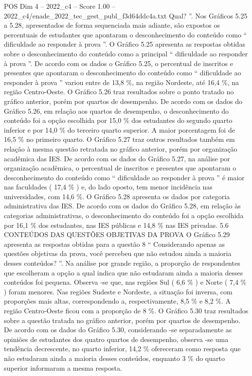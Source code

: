 \begin{textsample}{POS Dim 4 – 2022\_c4 – Score 1.00 – 2022\_c4/enade\_2022\_tec\_gest\_publ\_f3d64ddc4a.txt}
Qual? ”.
Nos Gráficos 5.25 a 5.28, apresentados de forma sequenciada mais adiante, são expostos os percentuais de estudantes que apontaram o desconhecimento do conteúdo como “ dificuldade ao responder à prova ”.
O Gráfico 5.25 apresenta as respostas obtidas sobre o desconhecimento do conteúdo como a principal “ dificuldade ao responder à prova ”.
De acordo com os dados o Gráfico 5.25, o percentual de inscritos e presentes que apontaram o desconhecimento do conteúdo como “ dificuldade ao responder à prova ” variou entre de 13,8 \%, na região Nordeste, até 16,4 \%, na região Centro-Oeste.
O Gráfico 5.26 traz resultados sobre o ponto tratado no gráfico anterior, porém por quartos de desempenho.
De acordo com os dados do Gráfico 5.26, em relação aos quartos de desempenho, o desconhecimento do conteúdo foi a opção escolhida por 15,0 \% dos estudantes do segundo quarto inferior e por 14,0 \% do terceiro quarto superior.
A maior porcentagem foi de 16,5 \% no primeiro quarto.
O Gráfico 5.27 traz outros resultados também em relação à mesma questão retratada no gráfico anterior, porém por organização acadêmica das IES.
De acordo com os dados do Gráfico 5.27, na análise por organização acadêmica, o percentual de inscritos e presentes que apontaram o desconhecimento do conteúdo como “ dificuldade ao responder à prova ” é maior nas faculdades ( 17,4 \% ) e, do lado oposto, tem menor incidência nas universidades, com 14,6 \%.
O Gráfico 5.28 apresenta os dados por categoria administrativa das IES.
De acordo com os dados do Gráfico 5.28, em relação às categorias administrativas, o desconhecimento do conteúdo foi a opção escolhida por 16,1 \% dos estudantes, nas IES públicas e 14,8 \% nas IES privadas. 5.6 CONTEÚDOS DAS QUESTÕES OBJETIVAS DA PROVA O Gráfico 5.29 apresenta as respostas obtidas para a questão 8 “ Considerando apenas as questões objetivas da prova, você percebeu que não estudou ainda a maioria desses conteúdos? ”.
Na análise por grande região, a proporção de respondentes que escolheram a opção a qual indica que não estudaram ainda a maioria desses conteúdos foi pequena.
Observa -se que, nas regiões Sul ( 6,6 \% ) e Norte ( 7,4 \% ) foram menores.
Nas regiões Sudeste e Nordeste, a situação foi inversa, com proporções mais altas, correspondendo a, respectivamente, 8,5 \% e 8,2 \%.
A região Centro-Oeste ficou com a proporção de 8 \%.
O Gráfico 5.30 traz resultados sobre a questão tratada no gráfico anterior, porém por quartos de desempenho.
De acordo com os dados do Gráfico 5.30, considerando -se separadamente as opiniões de estudantes dos quatro quartos de desempenho, observa -se uma tendência decrescente, no quarto inferior, 14,2 \% ofereceram como resposta que não estudaram ainda a maioria desses conteúdos, enquanto 3 \% do quarto superior informaram a mesma resposta.

\end{textsample}
